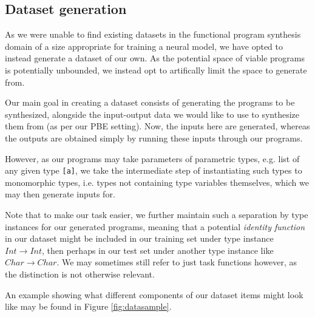 \documentclass{article} %
\begin{document}
\subsection{Dataset generation} \label{sec:datagen}

As we were unable to find existing datasets in the functional program synthesis domain
of a size appropriate for training a neural model,
we have opted to instead generate a dataset of our own.
As the potential space of viable programs is potentially unbounded,
we instead opt to artifically limit the space to generate from.

Our main goal in creating a dataset consists of generating the programs to be synthesized,
alongside the input-output data we would like to use to synthesize them from (as per our PBE setting).
Now, the inputs here are generated, whereas the outputs are obtained simply by running these inputs through our programs.

However, as our programs may take parameters of parametric types, e.g. list of any given type \verb|[a]|,
we take the intermediate step of instantiating such types to monomorphic types,
i.e. types not containing type variables themselves,
which we may then generate inputs for.

Note that to make our task easier,
we further maintain such a separation by type instances for our generated programs,
meaning that a potential \emph{identity function} in our dataset might be
included in our training set under type instance $Int \rightarrow Int$,
then perhaps in our test set under another type instance like $Char \rightarrow Char$.
%
We may sometimes still refer to just task functions however, as the distinction is not otherwise relevant.

An example showing what different components of our dataset items might look like may be found in Figure \ref{fig:datasample}.
\end{document}
